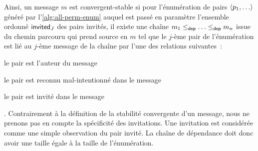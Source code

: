 Ainsi, un message $m$ est convergent-stable si pour l'énumération de pairs $\tuple*{p_1, \dotsc}$ généré par l'\autoref{alg:all-perm-enum} auquel est passé en paramètre l'ensemble ordonné $\operatorname{\mathsf{invited}}_J$ des pairs invités, il existe une chaîne $m_1 \leq_{\operatorname{\mathsf{dep}}} \dotsc \leq_{\operatorname{\mathsf{dep}}} m_n$ issue du chemin parcouru qui prend source en $m$ tel que le $j$-ème pair de l'énumération est lié au $j$-ème message de la chaîne par l'une des relations suivantes~: \begin{inlinelist}
    \item le pair est l'auteur du message
    \item le pair est reconnu mal-intentionné dans le message
    \item le pair est invité dans le message
\end{inlinelist}.
Contrairement à la définition de la stabilité convergente d'un message, nous ne prenons pas en compte la spécificité des invitations.
Une invitation est considérée comme une simple observation du pair invité.
La chaîne de dépendance doit donc avoir une taille égale à la taille de l'énumération.

